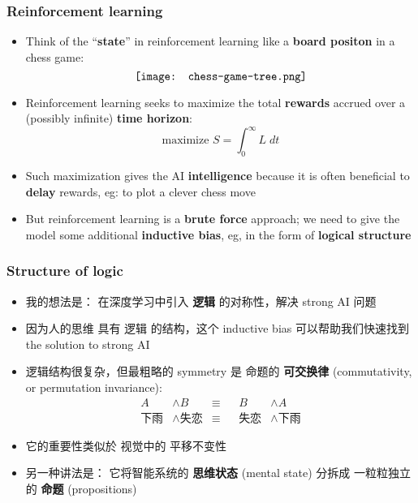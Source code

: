 \documentclass[16pt]{beamer}
\newcommand{\cc}[2]{#1}
\newcommand{\cc}[2]{#2}
\newcommand{\emp}[1]{\textbf{\color{violet}#1}}
\begin{document}
\begin{frame}
\frametitle{Reinforcement learning}
\begin{itemize}
	\item Think of the ``\textbf{state}'' in reinforcement learning like a \textbf{board positon} in a chess game:
	\begin{equation}
	\vcenter{\hbox{\texttt{[image: chess-game-tree.png]}}}
	\end{equation}
	\item Reinforcement learning seeks to maximize the total \textbf{rewards} accrued over a (possibly infinite) \textbf{time horizon}:
	\begin{equation}
	 \mbox{maximize }  S = \int_0^{\infty} L \; dt
	\end{equation}
	\item Such maximization gives the AI \textbf{intelligence} because it is often beneficial to \textbf{delay} rewards, eg: to plot a clever chess move
	\item But reinforcement learning is a \textbf{brute force} approach;  we need to give the model some additional \textbf{inductive bias}, eg, in the form of \textbf{logical structure}
\end{itemize}
\end{frame}

\begin{frame}
\frametitle{Structure of logic}
\begin{itemize}
	\item \cc{
	我的想法是： 在深度学习中引入 \emp{逻辑} 的对称性，解决 strong AI 问题}{
	The idea is:  introduce symmetries of \textbf{logic} into deep learning to solve the AGI problem
	}
	\item \cc{
	因为人的思维 具有 逻辑 的结构，这个 inductive bias 可以帮助我们快速找到 the solution to strong AI}{
	Because human cognition has logical structure, this inductive bias may help us find a solution to AGI faster
	}
	\item \cc{
	逻辑结构很复杂，但最粗略的 symmetry 是 命题的 \emp{可交换律} (commutativity, or permutation invariance):}{
	Logic is a complicated structure, but its simplest symmetry is the \textbf{commutativity} (or permutation invariance) of \textbf{propositions}:
	}
	\begin{equation}
	\begin{aligned}
	A &\wedge B & \equiv && B & \wedge A \\
	\mbox{\cc{下雨}{it's raining}} &\wedge \mbox{\cc{失恋}{lovesick}} & \equiv && \mbox{\cc{失恋}{lovesick}} &\wedge \mbox{\cc{下雨}{it's raining}}
	\end{aligned}
	\end{equation}
	\item \cc{
	它的重要性类似於 视觉中的 平移不变性}{
	Its importance may be analogous to translation invariance in vision
	}
	\item \cc{
	另一种讲法是： 它将智能系统的 \emp{思维状态} (mental state) 分拆成 一粒粒独立的 \emp{命题} (propositions)}{
	The significance of commutativity is:  it \textbf{decomposes} the AI system's \emp{mental state} into individual \emp{propositions}
	}
\end{itemize}
\end{frame}
\end{document}
